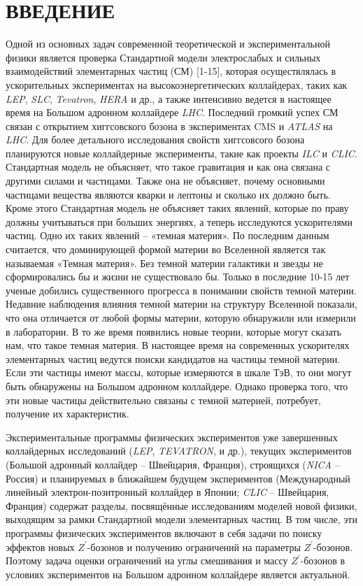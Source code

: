 \chapter*{ВВЕДЕНИЕ}
Одной из основных задач современной теоретической и экспериментальной физики является проверка Стандартной модели электрослабых и сильных взаимодействий элементарных частиц (СМ) [1-15], которая осуществлялась в ускорительных экспериментах на высокоэнергетических коллайдерах, таких как \textit{LEP}, \textit{SLC}, \textit{Tevatron}, \textit{HERA} и др., а также интенсивно ведется в настоящее время на Большом адронном коллайдере \textit{LHC}. Последний громкий успех СМ связан с открытием хиггсовского бозона в экспериментах CMS и \textit{ATLAS} на \textit{LHC}. Для более детального исследования свойств хиггсовсого бозона планируются новые коллайдерные эксперименты, такие как проекты \textit{ILC} и \textit{CLIC}. Стандартная модель не объясняет, что такое гравитация и как она связана с другими силами и частицами. Также она не объясняет, почему основными частицами вещества являются кварки и лептоны и сколько их должно быть. Кроме этого Стандартная модель не объясняет таких явлений, которые по праву должны учитываться при больших энергиях, а теперь исследуются ускорителями частиц. Одно их таких явлений – «темная материя». По последним данным считается, что доминирующей формой материи во Вселенной является так называемая «Темная материя». Без темной материи галактики и звезды не сформировались бы и жизни не существовало бы. Только в последние 10-15 лет ученые добились существенного прогресса в понимании свойств темной материи. Недавние наблюдения влияния темной материи на структуру Вселенной показали, что она отличается от любой формы материи, которую обнаружили или измерили в лаборатории. В то же время появились новые теории, которые могут сказать нам, что такое темная материя. В настоящее время на современных ускорителях элементарных частиц ведутся поиски кандидатов на частицы темной материи. Если эти частицы имеют массы, которые измеряются в шкале ТэВ, то они могут быть обнаружены на Большом адронном коллайдере. Однако проверка того, что эти новые частицы действительно связаны с темной материей, потребует, получение их характеристик.

Экспериментальные программы физических экспериментов уже завершенных коллайдерных исследований (\textit{LEP}, \textit{TEVATRON}, и др.), текущих экспериментов (Большой адронный коллайдер -- Швейцария, Франция), строящихся (\textit{NICA} -- Россия) и планируемых в ближайшем будущем экспериментов (Международный линейный электрон-позитронный коллайдер в Японии; \textit{CLIC} -- Швейцария, Франция) содержат разделы, посвящённые исследованиям моделей новой физики, выходящим за рамки Стандартной модели элементарных частиц. В том числе, эти программы физических экспериментов включают в себя задачи по поиску эффектов новых ${Z}^{\prime}$-бозонов и получению ограничений на параметры ${Z}^{\prime}$-бозонов. Поэтому задача оценки ограничений на углы смешивания и массу ${Z}^{\prime}$-бозонов в условиях экспериментов на Большом адронном коллайдере является актуальной.

